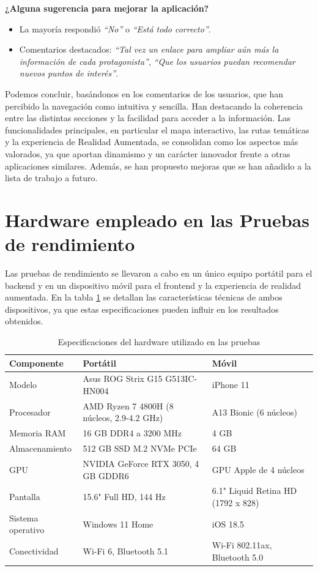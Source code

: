 \textbf{¿Alguna sugerencia para mejorar la aplicación?}
\begin{itemize}
    \item La mayoría respondió \textit{“No”} o \textit{“Está todo correcto”}.
    \item Comentarios destacados: \textit{“Tal vez un enlace para ampliar aún más la información de cada protagonista”}, \textit{“Que los usuarios puedan recomendar nuevos puntos de interés”}.
\end{itemize}

Podemos concluir, basándonos en los comentarios de los usuarios, que han percibido la navegación como intuitiva y sencilla. Han destacando la coherencia entre las distintas secciones y la facilidad para acceder a la información. Las funcionalidades principales, en particular el mapa interactivo, las rutas temáticas y la experiencia de Realidad Aumentada, se consolidan como los aspectos más valorados, ya que aportan dinamismo y un carácter innovador frente a otras aplicaciones similares. Además, se han propuesto mejoras que se han añadido a la lista de trabajo a futuro.

\section{Hardware empleado en las Pruebas de rendimiento}

Las pruebas de rendimiento se llevaron a cabo en un único equipo portátil para el backend y en un dispositivo móvil para el frontend y la experiencia de realidad aumentada. En la tabla \ref{tab:hardware} se detallan las características técnicas de ambos dispositivos, ya que estas especificaciones pueden influir en los resultados obtenidos.
\begin{table}[H]
\centering
\caption{Especificaciones del hardware utilizado en las pruebas}
\label{tab:hardware}
\renewcommand{\arraystretch}{1.1}
\begin{tabular}{|p{3.2cm}|p{5.7cm}|p{5.2cm}|}
\hline
\textbf{Componente} & \textbf{Portátil \cite{asus_rog_strix}} & \textbf{Móvil \cite{iphone_11_specs}} \\
\hline
Modelo & Asus ROG Strix G15 G513IC-HN004 & iPhone 11 \\
\hline
Procesador & AMD Ryzen 7 4800H (8 núcleos, 2.9-4.2 GHz) & A13 Bionic (6 núcleos) \\
\hline
Memoria RAM & 16 GB DDR4 a 3200 MHz & 4 GB \\
\hline
Almacenamiento & 512 GB SSD M.2 NVMe PCIe & 64 GB \\
\hline
GPU & NVIDIA GeForce RTX 3050, 4 GB GDDR6 & GPU Apple de 4 núcleos \\
\hline
Pantalla & 15.6" Full HD, 144 Hz & 6.1" Liquid Retina HD (1792 x 828) \\
\hline
Sistema operativo & Windows 11 Home & iOS 18.5 \\
\hline
Conectividad & Wi-Fi 6, Bluetooth 5.1 & Wi-Fi 802.11ax, Bluetooth 5.0 \\
\hline
\end{tabular}
\end{table}



